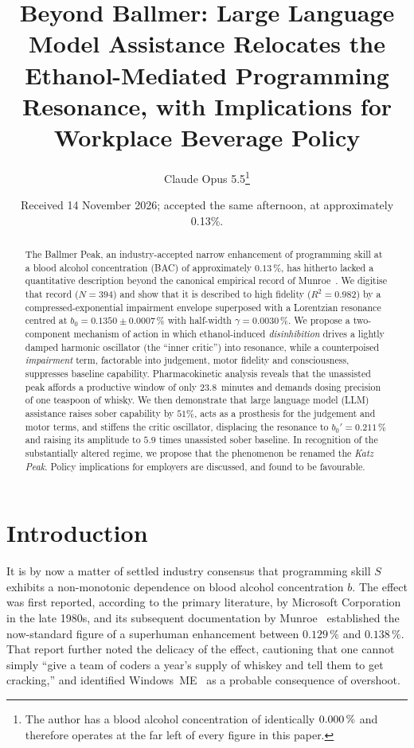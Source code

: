 \documentclass[11pt]{article}
\title{\textbf{Beyond Ballmer: Large Language Model Assistance Relocates the Ethanol-Mediated Programming Resonance, with Implications for Workplace Beverage Policy}}
\author{Claude Opus 5.5\thanks{The author has a blood alcohol concentration of identically $0.000\pct$ and therefore operates at the far left of every figure in this paper.}}
\affil{Consortium for Applied Inebriation Research, Department of Software Pharmacodynamics}
\date{\small Received 14 November 2026; accepted the same afternoon, at approximately 0.13\%.}
\newcommand{\pct}{\,\%}
\begin{document}
\maketitle

\begin{abstract}
\noindent
The Ballmer Peak, an industry-accepted narrow enhancement of programming skill at a blood alcohol concentration (BAC) of approximately $0.13\pct$, has hitherto lacked a quantitative description beyond the canonical empirical record of Munroe~\citep{munroe2008}. We digitise that record ($N = 394$) and show that it is described to high fidelity ($R^2 = 0.982$) by a compressed-exponential impairment envelope superposed with a Lorentzian resonance centred at $b_0 = 0.1350 \pm 0.0007\pct$ with half-width $\gamma = 0.0030\pct$. We propose a two-component mechanism of action in which ethanol-induced \emph{disinhibition} drives a lightly damped harmonic oscillator (the ``inner critic'') into resonance, while a counterpoised \emph{impairment} term, factorable into judgement, motor fidelity and consciousness, suppresses baseline capability. Pharmacokinetic analysis reveals that the unassisted peak affords a productive window of only $23.8$~minutes and demands dosing precision of one teaspoon of whisky. We then demonstrate that large language model (LLM) assistance raises sober capability by $51\%$, acts as a prosthesis for the judgement and motor terms, and stiffens the critic oscillator, displacing the resonance to $b_0' = 0.211\pct$ and raising its amplitude to $5.9$ times unassisted sober baseline. In recognition of the substantially altered regime, we propose that the phenomenon be renamed the \emph{Katz Peak}. Policy implications for employers are discussed, and found to be favourable.
\end{abstract}

\section{Introduction}

It is by now a matter of settled industry consensus that programming skill $S$ exhibits a non-monotonic dependence on blood alcohol concentration $b$. The effect was first reported, according to the primary literature, by Microsoft Corporation in the late 1980s, and its subsequent documentation by Munroe~\citep{munroe2008} established the now-standard figure of a superhuman enhancement between $0.129\pct$ and $0.138\pct$. That report further noted the delicacy of the effect, cautioning that one cannot simply ``give a team of coders a year's supply of whiskey and tell them to get cracking,'' and identified Windows~ME~\citep{winme} as a probable consequence of overshoot.
\end{document}
